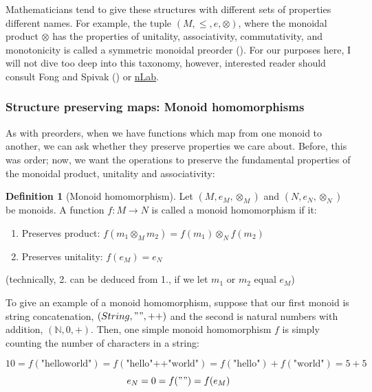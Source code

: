 \documentclass[
]{book}
\providecommand{\tightlist}{%
  \setlength{\itemsep}{0pt}\setlength{\parskip}{0pt}}
\theoremstyle{definition}
\newtheorem{definition}{Definition}[chapter]
\theoremstyle{definition}
\theoremstyle{definition}
\theoremstyle{definition}
\theoremstyle{remark}
\begin{document}
Mathematicians tend to give these structures with different sets of properties different names. For example, the tuple \((M, \leq, e, \otimes)\), where the monoidal product \(\otimes\) has the properties of unitality, associativity, commutativity, and monotonicity is called a symmetric monoidal preorder (). For our purposes here, I will not dive too deep into this taxonomy, however, interested reader should consult Fong and Spivak () or \href{https://ncatlab.org/nlab/show/HomePage}{nLab}.

\subsubsection{Structure preserving maps: Monoid homomorphisms}\label{monoid-homomorphism}

As with preorders, when we have functions which map from one monoid to another, we can ask whether they preserve properties we care about. Before, this was order; now, we want the operations to preserve the fundamental properties of the monoidal product, unitality and associativity:

\begin{definition}[Monoid homomorphism]

Let \((M, e_M, \otimes_M)\) and \((N, e_N, \otimes_N)\) be monoids. A function \(f: M \to N\) is called a monoid homomorphism if it:

\begin{enumerate}
\def\labelenumi{\arabic{enumi}.}
\tightlist
\item
  Preserves product: \(f(m_1 \otimes_M m_2) = f(m_1) \otimes_N f(m_2)\)
\item
  Preserves unitality: \(f(e_M) = e_N\)
\end{enumerate}

\end{definition}

(technically, 2. can be deduced from 1., if we let \(m_1\) or \(m_2\) equal \(e_M\))

To give an example of a monoid homomorphism, suppose that our first monoid is string concatenation, \((String, "", ++)\) and the second is natural numbers with addition, \((\mathbb{N}, 0, +)\). Then, one simple monoid homomorphism \(f\) is simply counting the number of characters in a string:

\[10 = f(\text{"helloworld"}) = f(\text{"hello"} \text{++} \text{"world"}) = f(\text{"hello"}) + f(\text{"world"}) = 5 + 5\]
\[e_N = 0 = f("") = f(e_M)\]
\end{document}
